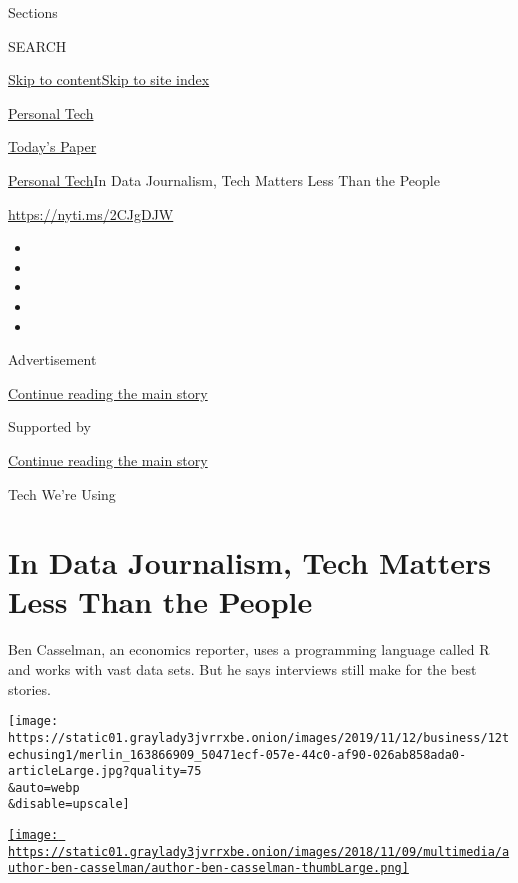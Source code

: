 Sections

SEARCH

\protect\hyperlink{site-content}{Skip to
content}\protect\hyperlink{site-index}{Skip to site index}

\href{https://www.nytimes3xbfgragh.onion/section/technology/personaltech}{Personal
Tech}

\href{https://myaccount.nytimes3xbfgragh.onion/auth/login?response_type=cookie\&client_id=vi}{}

\href{https://www.nytimes3xbfgragh.onion/section/todayspaper}{Today's
Paper}

\href{/section/technology/personaltech}{Personal Tech}\textbar{}In Data
Journalism, Tech Matters Less Than the People

\url{https://nyti.ms/2CJgDJW}

\begin{itemize}
\item
\item
\item
\item
\item
\end{itemize}

Advertisement

\protect\hyperlink{after-top}{Continue reading the main story}

Supported by

\protect\hyperlink{after-sponsor}{Continue reading the main story}

Tech We're Using

\hypertarget{in-data-journalism-tech-matters-less-than-the-people}{%
\section{In Data Journalism, Tech Matters Less Than the
People}\label{in-data-journalism-tech-matters-less-than-the-people}}

Ben Casselman, an economics reporter, uses a programming language called
R and works with vast data sets. But he says interviews still make for
the best stories.

\texttt{[image: https://static01.graylady3jvrrxbe.onion/images/2019/11/12/business/12techusing1/merlin\_163866909\_50471ecf-057e-44c0-af90-026ab858ada0-articleLarge.jpg?quality=75\\\&auto=webp\\\&disable=upscale]}

\href{https://www.nytimes3xbfgragh.onion/by/ben-casselman}{\texttt{[image: https://static01.graylady3jvrrxbe.onion/images/2018/11/09/multimedia/author-ben-casselman/author-ben-casselman-thumbLarge.png]}}

